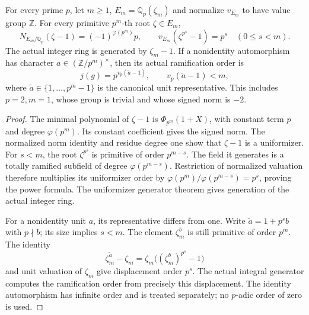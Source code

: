 \begin{lemma}
\label{ft:finite-cyclotomic-displacement}
\leanok
For every prime $p$, let $m\geq1$, $E_m=\mathbb Q_p(\zeta_m)$
and normalize $v_{E_m}$ to have value group $\mathbb Z$.
For every primitive $p^m$-th root $\zeta\in E_m$,
\[
 N_{E_m/\mathbb Q_p}(\zeta-1)=(-1)^{\varphi(p^m)}p,
 \qquad v_{E_m}(\zeta^{p^s}-1)=p^s\quad(0\leq s<m).
\]
The actual integer ring is generated by $\zeta_m-1$. If a
nonidentity automorphism has character $a\in(\mathbb Z/p^m)^\times$,
then its actual ramification order is
\[
 j(g)=p^{v_p(\widetilde a-1)},\qquad v_p(\widetilde a-1)<m,
\]
where $\widetilde a\in\{1,\ldots,p^m-1\}$ is the canonical
unit representative. This includes $p=2,m=1$, whose group is
trivial and whose signed norm is $-2$.
\end{lemma}
\begin{proof}
The minimal polynomial of $\zeta-1$ is
$\Phi_{p^m}(1+X)$, with constant term $p$ and degree
$\varphi(p^m)$. Its constant coefficient gives the signed norm.
The normalized norm identity and residue degree one show that
$\zeta-1$ is a uniformizer. For $s<m$, the root $\zeta^{p^s}$
is primitive of order $p^{m-s}$. The field it generates is a
totally ramified subfield of degree $\varphi(p^{m-s})$.
Restriction of normalized valuation therefore multiplies its
uniformizer order by
$\varphi(p^m)/\varphi(p^{m-s})=p^s$, proving the power formula.
The uniformizer generator theorem gives generation of the
actual integer ring.

For a nonidentity unit $a$, its representative differs from one.
Write $\widetilde a=1+p^s b$ with $p\nmid b$; its size implies
$s<m$. The element $\zeta_m^b$ is still primitive of order
$p^m$. The identity
\[
 \zeta_m^{\widetilde a}-\zeta_m
 =\zeta_m\bigl((\zeta_m^b)^{p^s}-1\bigr)
\]
and unit valuation of $\zeta_m$ give displacement order $p^s$.
The actual integral generator computes the ramification order
from precisely this displacement. The identity automorphism has
infinite order and is treated separately; no $p$-adic order of
zero is used.
\end{proof}

